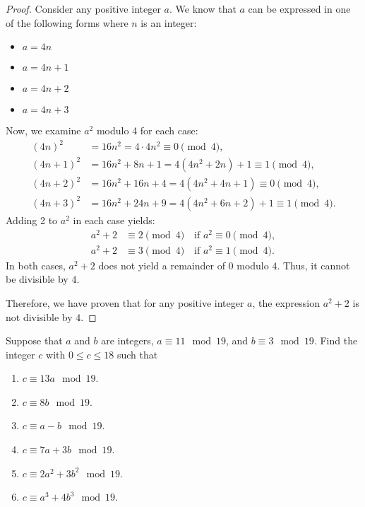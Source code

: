     \begin{proof}
        Consider any positive integer $a$. We know that $a$ can be expressed in one of the following forms where $n$ is an integer:
        \begin{itemize}
            \item $a = 4n$
            \item $a = 4n + 1$
            \item $a = 4n + 2$
            \item $a = 4n + 3$
        \end{itemize}
        Now, we examine $a^2$ modulo 4 for each case:
        \begin{align*}
            (4n)^2 &= 16n^2 = 4 \cdot 4n^2 \equiv 0 \pmod{4}, \\
            (4n + 1)^2 &= 16n^2 + 8n + 1 = 4(4n^2 + 2n) + 1 \equiv 1 \pmod{4}, \\
            (4n + 2)^2 &= 16n^2 + 16n + 4 = 4(4n^2 + 4n + 1) \equiv 0 \pmod{4}, \\
            (4n + 3)^2 &= 16n^2 + 24n + 9 = 4(4n^2 + 6n + 2) + 1 \equiv 1 \pmod{4}.
        \end{align*}
        Adding 2 to $a^2$ in each case yields:
        \begin{align*}
            a^2 + 2 &\equiv 2 \pmod{4} \quad \text{if } a^2 \equiv 0 \pmod{4}, \\
            a^2 + 2 &\equiv 3 \pmod{4} \quad \text{if } a^2 \equiv 1 \pmod{4}.
        \end{align*}
        In both cases, $a^2 + 2$ does not yield a remainder of $0$ modulo $4$. Thus, it cannot be divisible by $4$.

        Therefore, we have proven that for any positive integer $a$, the expression $a^2 + 2$ is not divisible by $4$.
    \end{proof}

    \begin{exercise}
        Suppose that \( a \) and \( b \) are integers, \( a \equiv 11 \mod{19} \), and \( b \equiv 3 \mod{19} \). 
        Find the integer \( c \) with \( 0 \leq c \leq 18 \) such that
        \begin{enumerate}
            \item \( c \equiv 13a \mod{19} \).
            \item \( c \equiv 8b \mod{19} \).
            \item \( c \equiv a - b \mod{19} \).
            \item \( c \equiv 7a + 3b \mod{19} \).
            \item \( c \equiv 2a^2 + 3b^2 \mod{19} \).
            \item \( c \equiv a^3 + 4b^3 \mod{19} \).
        \end{enumerate}
    \end{exercise}

